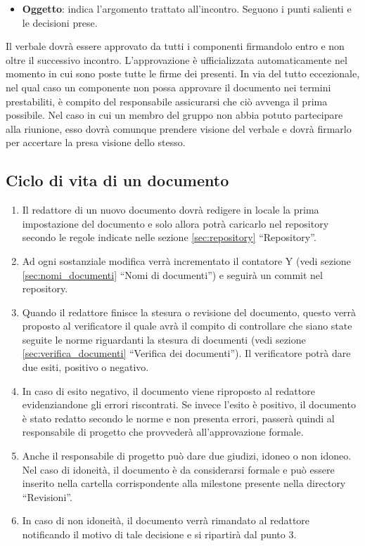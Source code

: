 \begin{itemize}
\begin{itemize}
\item \textbf{Oggetto}: indica l'argomento trattato all'incontro. Seguono i punti salienti e le decisioni prese.
\end{itemize}
Il verbale dovrà essere approvato da tutti i componenti firmandolo entro e non oltre il successivo incontro. L'approvazione è ufficializzata automaticamente nel momento in cui sono poste tutte le firme dei presenti. In via del tutto eccezionale, nel qual caso un componente non possa approvare il documento nei termini prestabiliti, è compito del responsabile assicurarsi che ciò avvenga il prima possibile. Nel caso in cui un membro del gruppo non abbia potuto partecipare alla riunione, esso dovrà comunque prendere visione del verbale e dovrà firmarlo per accertare la presa visione dello stesso.
\end{itemize}

\subsection{Ciclo di vita di un documento}
\begin{enumerate}
\item Il redattore di un nuovo documento dovrà redigere in locale la prima impostazione del documento e solo allora potrà caricarlo nel repository secondo le regole indicate nelle sezione \ref{sec:repository} ``Repository''.
\item Ad ogni sostanziale modifica verrà incrementato il contatore Y (vedi sezione \ref{sec:nomi_documenti} ``Nomi di documenti'') e seguirà un commit nel repository.
\item Quando il redattore finisce la stesura o revisione del documento, questo verrà proposto al verificatore il quale avrà il compito di controllare che siano state seguite le norme riguardanti la stesura di documenti (vedi sezione \ref{sec:verifica_documenti} ``Verifica dei documenti''). Il verificatore potrà dare due esiti, positivo o negativo.
\item
In caso di esito negativo, il documento viene riproposto al redattore evidenziandone gli errori riscontrati. Se invece l'esito è positivo, il documento è stato redatto secondo le norme e non presenta errori, passerà quindi al responsabile di progetto che provvederà all'approvazione formale.
\item Anche il responsabile di progetto può dare due giudizi, idoneo o non idoneo. Nel caso di idoneità, il documento è da considerarsi formale e può essere inserito nella cartella corrispondente alla milestone presente nella directory ``Revisioni''.
\item In caso di non idoneità, il documento verrà rimandato al redattore notificando il motivo di tale decisione e si ripartirà dal punto 3.
\end{enumerate}

